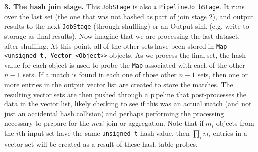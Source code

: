 \vspace{5pt}
{\bf 3. The hash join stage.} 
This \texttt{JobStage} is also a \texttt{PipelineJo bStage}. It runs over the last set (the one that was not 
hashed as part of join stage 2), and output results to the next
\texttt{JobStage} (through shuffling) or an Output sink (e.g. write to storage
as final results). Now imagine that we are processing the last dataset, after shuffling.  At this point,
all of the other sets have been
stored in \texttt{Map <unsigned\_t, Vector <Object}\texttt{>}\texttt{>} objects.  As we process the final set,
the hash value for each object is used to probe the \texttt{Map}
associated with each of the other $n-1$ sets.  If a match is found in each one of those other $n-1$ sets, then
one or more entries in the output vector list are created to store the matches.  The resulting vector sets are then pushed through a pipeline that post-processes
the data in the vector list, likely checking to see if this was an actual match (and not just an accidental hash collision) and perhaps performing the processing
necessary to prepare for the \emph{next} join or aggregation.
Note that if $m_i$ objects from the $i$th input set have the same \texttt{unsigned\_t} hash value, then $\prod_i m_i$ entries in a vector set will be created
as a result of these hash table probes. 

%
%
%
